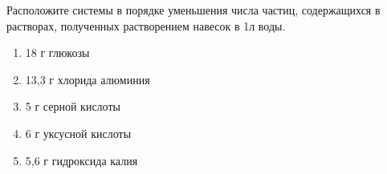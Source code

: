 
Расположите системы в
порядке уменьшения числа частиц, содержащихся в растворах, полученных
растворением навесок в 1л воды.

\begin{enumerate}
    \item 18 г глюкозы
    \item 13,3 г хлорида алюминия
    \item 5 г серной кислоты
    \item 6 г уксусной кислоты
    \item 5,6 г гидроксида калия
\end{enumerate}




